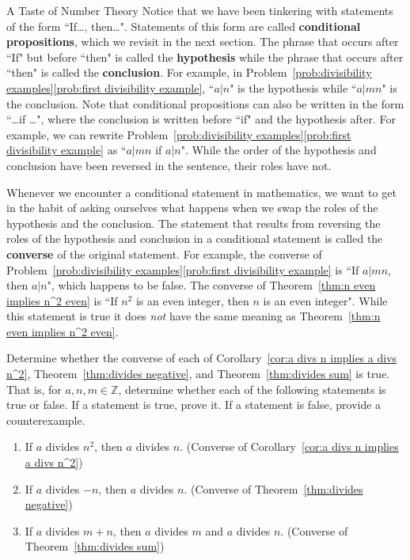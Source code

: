 \begin{section}{A Taste of Number Theory}
Notice that we have been tinkering with statements of the form ``If\ldots, then\ldots". Statements of this form are called \textbf{conditional propositions}, which we revisit in the next section.  The phrase that occurs after ``If" but before ``then" is called the \textbf{hypothesis} while the phrase that occurs after ``then" is called the \textbf{conclusion}.  For example, in Problem~\ref{prob:divisibility examples}\ref{prob:first divisibility example}, ``$a|n$" is the hypothesis while ``$a|mn$" is the conclusion.  Note that conditional propositions can also be written in the form ``\ldots if \ldots", where the conclusion is written before ``if" and the hypothesis after. For example, we can rewrite Problem~\ref{prob:divisibility examples}\ref{prob:first divisibility example} as ``$a|mn$ if $a|n$".  While the order of the hypothesis and conclusion have been reversed in the sentence, their roles have not.

Whenever we encounter a conditional statement in mathematics, we want to get in the habit of asking ourselves what happens when we swap the roles of the hypothesis and the conclusion.  The statement that results from reversing the roles of the hypothesis and conclusion in a conditional statement is called the \textbf{converse} of the original statement.  For example, the converse of Problem~\ref{prob:divisibility examples}\ref{prob:first divisibility example} is ``If $a|mn$, then $a|n$", which happens to be false. The converse of Theorem~\ref{thm:n even implies n^2 even} is ``If $n^2$ is an even integer, then $n$ is an even integer". While this statement is true it does \emph{not} have the same meaning as Theorem~\ref{thm:n even implies n^2 even}. 

\begin{problem}
Determine whether the converse of each of Corollary~\ref{cor:a divs n implies a divs n^2}, Theorem~\ref{thm:divides negative}, and Theorem~\ref{thm:divides sum} is true.  That is, for $a,n,m\in\mathbb{Z}$, determine whether each of the following statements is true or false. If a statement is true, prove it. If a statement is false, provide a counterexample.
\begin{enumerate}[label=\textrm{(\alph*)}]
\item If $a$ divides $n^2$, then $a$ divides $n$. (Converse of Corollary~\ref{cor:a divs n implies a divs n^2})
\item If $a$ divides $-n$, then $a$ divides $n$. (Converse of Theorem~\ref{thm:divides negative})
\item If $a$ divides $m+n$, then $a$ divides $m$ and $a$ divides $n$. (Converse of Theorem~\ref{thm:divides sum})
\end{enumerate}
\end{problem}


\end{section}
